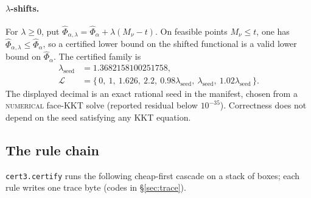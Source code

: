 \documentclass[11pt]{article}
\theoremstyle{plain}
\theoremstyle{definition}
\theoremstyle{remark}
\newcommand{\NUMERICAL}{\textsc{numerical}}
\begin{document}
\paragraph{$\lambda$-shifts.}
For $\lambda\ge0$, put
$\widehat\Phi_{\alpha,\lambda}
=\widehat\Phi_\alpha+\lambda(M_\nu-t)$.  On feasible points
$M_\nu\le t$, one has
$\widehat\Phi_{\alpha,\lambda}\le\widehat\Phi_\alpha$, so a certified lower
bound on the shifted functional is a valid lower bound on
$\widehat\Phi_\alpha$. The certified family is
\[
\begin{aligned}
\lambda_{\mathrm{seed}}&=1.3682158100251758,\\
\mathcal L&=\{\,0,\ 1,\ 1.626,\ 2.2,\ 0.98\lambda_{\mathrm{seed}},\
\lambda_{\mathrm{seed}},\ 1.02\lambda_{\mathrm{seed}}\,\}.
\end{aligned}
\]
The displayed decimal is an exact rational seed in the manifest, chosen from
a \NUMERICAL{} face-KKT solve (reported residual below $10^{-35}$).
Correctness does not depend on the seed satisfying any KKT equation.

\subsection{The rule chain}
\texttt{cert3.certify} runs the following cheap-first cascade on a stack of
boxes; each rule writes one trace byte (codes in \S\ref{sec:trace}).
\end{document}
